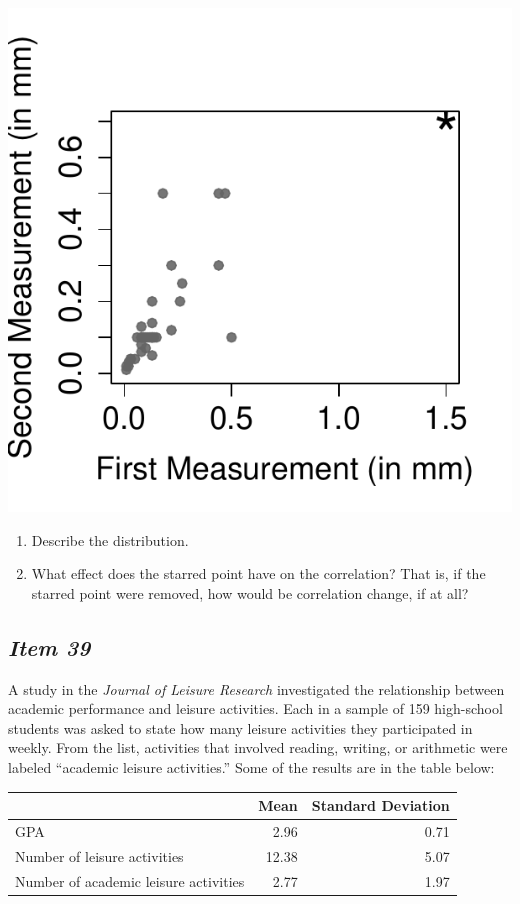 \begin{marginfigure}
\includegraphics{includes/Item32_R.pdf}
\end{marginfigure}
 
\begin{enumerate}[leftmargin=1cm, itemsep=.2em]
\item Describe the distribution.
\item What effect does the starred point have on the correlation?  That is, if the starred point were removed, how would be correlation change, if at all?
\end{enumerate}

\subsection{\textbf{\textit{Item 39}}}
A study in the \textit{Journal of Leisure Research} investigated the relationship between academic performance and leisure activities.  Each in a sample of 159 high-school students was asked to state how many leisure activities they participated in weekly.  From the list, activities that involved reading, writing, or arithmetic were labeled ``academic leisure activities.'' Some of the results are in the table below:

\begin{table}[!ht]
\begin{center}
\begin{tabular}{lrr}
\hline
& Mean & Standard Deviation\\
\hline
GPA & 2.96 & 0.71\\
Number of leisure activities & 12.38 & 5.07\\
Number of academic leisure activities & 2.77 & 1.97\\
\hline
\end{tabular}
\end{center}
\end{table}

